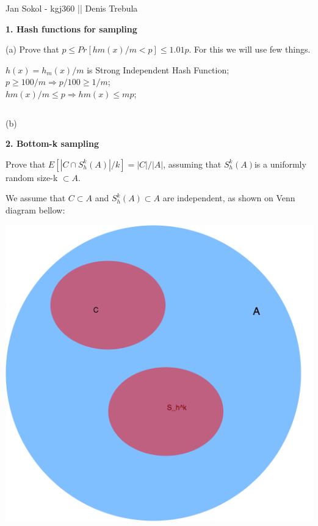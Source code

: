 \documentclass[12pt]{article}
\begin{document}
\newcommand{\topic}[1]{
  \begin{minipage}{\linewidth}
  {\bf #1}

  \end{minipage}
}
 Jan Sokol - kgj360 || Denis Trebula \\


\topic{1. Hash functions for sampling}

(a) Prove that $p \leq Pr[hm(x)/m < p] \leq 1.01p $. For this we will use few things. 

$ h(x) = h_m(x)/m $ is Strong Independent Hash Function; \\
$ p \geq 100/m  \Rightarrow p/100 \geq 1/m$; \\
$ hm(x)/m \leq p \Rightarrow hm(x) \leq mp$; \\

\begin{lstlisting}[language=R]
\end{lstlisting}


(b)

\topic{2. Bottom-k sampling}


Prove that $ E[|C \cap S_h^k(A)|/k] = |C |/|A| $, assuming that $ S_h^k(A) $is a uniformly random size-k $ \subset	A$.

We assume that $C \subset	A$ and $S_h^k(A) \subset	A$ are independent, as shown on Venn diagram bellow:

\includegraphics[scale=0.3]{venn.png}
\end{document}
